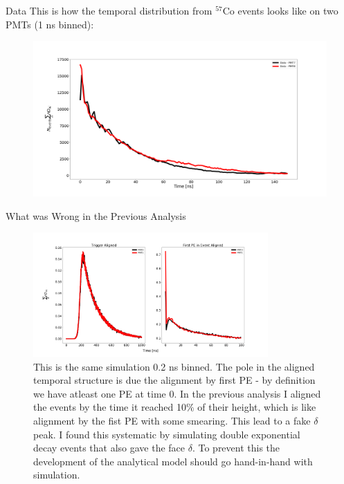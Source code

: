 \documentclass{beamer}
\begin{document}
\begin{frame}{Data}
This is how the temporal distribution from $^{57}$Co events looks like on two PMTs (1 ns binned):
\begin{figure}[h]
\includegraphics[width=1\textwidth]{data.png}
\end{figure}
\end{frame}

\begin{frame}{What was Wrong in the Previous Analysis}
\begin{figure}[h]
\includegraphics[width=0.8\textwidth]{sim1000.png}
\caption{This is the same simulation 0.2 ns binned. The pole in the aligned temporal structure is due the alignment by first PE - by definition we have atleast one PE at time 0. In the previous analysis I aligned the events by the time it reached 10$\%$ of their height, which is like alignment by the fist PE with some smearing. This lead to a fake $\delta$ peak. I found this systematic by simulating double exponential decay events that also gave the face $\delta$. To prevent this the development of the analytical model should go hand-in-hand with simulation.}
\end{figure}
\end{frame}
\end{document}
